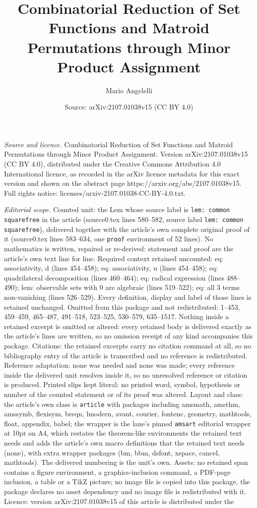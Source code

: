 \documentclass[10pt,a4paper]{amsart}
\title[Combinatorial Reduction of Set Functions and Matroid Permuta]{Combinatorial Reduction of Set Functions and Matroid Permutations through Minor Product Assignment}
\author{Mario Angelelli}
\date{Source: arXiv:2107.01038v15 (CC BY 4.0)}
\begin{document}
\maketitle

\noindent\emph{Source and licence.} Combinatorial Reduction of Set Functions and Matroid Permutations through Minor Product Assignment. Version arXiv:2107.01038v15 (CC BY 4.0), distributed under the Creative Commons Attribution 4.0 International licence, as recorded in the arXiv licence metadata for this exact version and shown on the abstract page https://arxiv.org/abs/2107.01038v15. Full rights notice: licenses/arxiv-2107.01038-CC-BY-4.0.txt.\par\smallskip

\noindent\textit{Editorial scope.} Counted unit: the Lem whose source label is \texttt{lem: common squarefree} in the article (source0.tex lines 580--582, source label \texttt{lem: common squarefree}), delivered together with the article's own complete original proof of it (source0.tex lines 583--634, one \texttt{proof} environment of 52 lines). No mathematics is written, repaired or re-derived: statement and proof are the article's own text line for line. Required context retained uncounted: eq: associativity, d (lines 454--458); eq: associativity, u (lines 454--458); eq: quadrilateral decomposition (lines 460--464); eq: radical expression (lines 488--490); lem: observable sets with 0 are algebraic (lines 519--522); eq: all 3 terms non-vanishing (lines 526--529). Every definition, display and label of those lines is retained unchanged. Omitted from this package and not redistributed: 1--453, 459--459, 465--487, 491--518, 523--525, 530--579, 635--1517. Nothing inside a retained excerpt is omitted or altered: every retained body is delivered exactly as the article's lines are written, so no omission receipt of any kind accompanies this package. Citations: the retained excerpts carry no citation command at all, so no bibliography entry of the article is transcribed and no reference is redistributed. Reference adaptation: none was needed and none was made; every reference inside the delivered unit resolves inside it, so no unresolved reference or citation is produced. Printed slips kept literal: no printed word, symbol, hypothesis or number of the counted statement or of its proof was altered. Layout and class: the article's own class is \texttt{article} with packages including amsmath, amsthm, amssymb, flexisym, breqn, lmodern, avant, courier, fontenc, geometry, mathtools, float, appendix, babel; the wrapper is the lane's pinned \texttt{amsart} editorial wrapper at 10pt on A4, which restates the theorem-like environments the retained text needs and adds the article's own macro definitions that the retained text needs (none), with extra wrapper packages (bm, bbm, dsfont, xspace, cancel, mathtools). The delivered numbering is the unit's own. Assets: no retained span contains a figure environment, a graphics-inclusion command, a PDF-page inclusion, a table or a TikZ picture; no image file is copied into this package, the package declares no asset dependency and no image file is redistributed with it. Licence: version arXiv:2107.01038v15 of this article is distributed under the 
\end{document}
